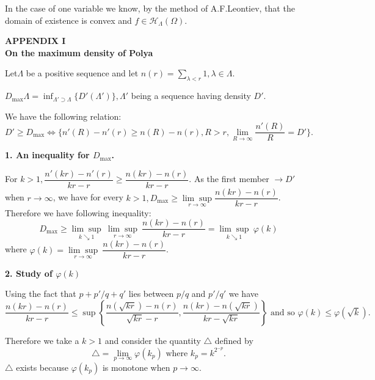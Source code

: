 In the case of one variable we know, by the method of A.F.Leontiev,
that the domain of existence is convex and $f \in \mathscr{H}_\Lambda
(\Omega)$. 
\newpage

\begin{center}
  \textbf{\Large APPENDIX I}\\ 
  \textbf{\large On the maximum density of Polya}
\end{center}
\medskip

Let\pageoriginale $\Lambda$ be a positive sequence and let $n(r) =
\sum\limits_{\lambda < r} 1, \lambda \in \Lambda$. 

\begin{defi*}%
 $D_{\max} \Lambda = \inf_{\Lambda' \supset \Lambda} \{D' (\Lambda')
 \}, \Lambda'$ being a sequence having density $D'$. 
\end{defi*}

We have the following relation:
$$
D' \ge D_{\max} \Longleftrightarrow \{n'(R) - n'(r) \ge n(R) - n(r), R
> r, \lim_{R \rightarrow \infty} \frac{n'(R)}{R} = D' \}. 
$$
\medskip


\noindent
\textbf{1. An inequality for $D_{\max}$.}

For $k > 1, \dfrac{n'(kr) - n'(r)}{kr - r} \ge \dfrac{n(kr) - n(r)}{kr
 - r}$. As the first member $\rightarrow D'$ when $r \rightarrow
\infty$, we have for every $k > 1, D_{\max} \ge \underset{r
 \rightarrow \infty}{\lim \sup} \dfrac{n(kr) - n(r)}{kr
 -r}$. Therefore we have following inequality: 
\begin{equation}
 D_{\max} \ge \underset{k \searrow 1}{\lim\sup} ~ \underset{r
 \rightarrow \infty}{\lim \sup} ~ \frac{n(kr) - n(r)}{kr-r} =
 \underset{k \searrow 1}{\lim \sup} ~ \varphi (k) \tag{*} 
\end{equation}
where $\varphi (k) = \underset{r \rightarrow \infty}{\lim \sup} ~
\dfrac{n(kr) - n(r)}{kr-r}$. 
\medskip

\noindent
\textbf{2. Study of $\varphi(k)$}

Using the fact that $p+ p' / q+ q'$ lies between $p/q$ and $p'/q'$ we have
{\fontsize{10}{12}\selectfont
$$
\frac{n(kr) - n(r)}{kr -r} \le \sup \left\{ \frac{n(\sqrt{kr}) -
 n(r)}{\sqrt{kr} - r}, \frac{n(kr) - n(\sqrt{kr})}{kr - \sqrt{kr}} \right\}
\text{ and so } \varphi (k) \le \varphi (\sqrt{k}). 
$$}\relax

Therefore we take a $k > 1$ and consider the quantity $\triangle$ defined by 
\begin{equation}
 \triangle = \lim_{p \rightarrow \infty} \varphi(k_p) \text{ where }
 k_p = k^{2^{-p}}. \tag{**} 
\end{equation}
$\triangle$ exists because $\varphi(k_p)$ is monotone when $p \rightarrow \infty$.
\medskip

